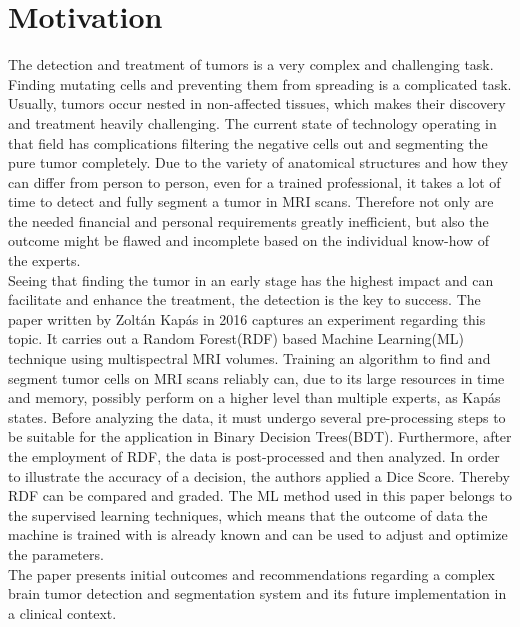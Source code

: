 \documentclass[
12pt,
headsepline,
bibliography=totoc,
twoside=semi,
fleqn
]{scrartcl}
\begin{document}

\section{Motivation\label{sec:sec1}}
The detection and treatment of tumors is a very complex and challenging task. Finding mutating cells and preventing them from spreading is a complicated task. Usually, tumors occur nested in non-affected tissues, which makes their discovery and treatment heavily challenging. The current state of technology operating in that field has complications filtering the negative cells out and segmenting the pure tumor completely. Due to the variety of anatomical structures and how they can differ from person to person, even for a trained professional, it takes a lot of time to detect and fully segment a tumor in MRI scans. Therefore not only are the needed financial and personal requirements greatly inefficient, but also the outcome might be flawed and incomplete based on the individual know-how of the experts.\\

Seeing that finding the tumor in an early stage has the highest impact and can facilitate and enhance the treatment, the detection is the key to success. The paper written by Zoltán Kapás in 2016 captures an experiment regarding this topic. It carries out a Random Forest(RDF) based Machine Learning(ML) technique using multispectral MRI volumes. Training an algorithm to find and segment tumor cells on MRI scans reliably can, due to its large resources in time and memory, possibly perform on a higher level than multiple experts, as Kapás states. Before analyzing the data, it must undergo several pre-processing steps to be suitable for the application in Binary Decision Trees(BDT). Furthermore, after the employment of RDF, the data is post-processed and then analyzed. In order to illustrate the accuracy of a decision, the authors applied a Dice Score. Thereby RDF can be compared and graded. The ML method used in this paper belongs to the supervised learning techniques, which means that the outcome of data the machine is trained with is already known and can be used to adjust and optimize the parameters.\\

The paper presents initial outcomes and recommendations regarding a complex brain tumor detection and segmentation system and its future implementation in a clinical context.
\end{document}
